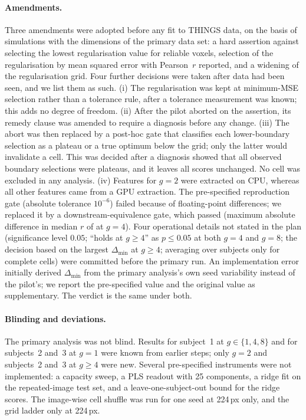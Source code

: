 \paragraph{Amendments.}
Three amendments were adopted before any fit to THINGS data, on the basis of
simulations with the dimensions of the primary data set: a hard assertion against
selecting the lowest regularisation value for reliable voxels, selection of the
regularisation by mean squared error with Pearson~$r$ reported, and a widening of the
regularisation grid. Four further decisions were taken after data had been seen, and we
list them as such. (i) The regularisation was kept at minimum-MSE selection rather than
a tolerance rule, after a tolerance measurement was known; this adds no degree of
freedom. (ii) After the pilot aborted on the assertion, its remedy clause was amended
to require a diagnosis before any change. (iii) The abort was then replaced by a post-hoc
gate that classifies each lower-boundary selection as a plateau or a true optimum below
the grid; only the latter would invalidate a cell. This was decided after a diagnosis
showed that all observed boundary selections were plateaus, and it leaves all scores
unchanged. No cell was excluded in any analysis. (iv) Features for $g = 2$ were
extracted on CPU, whereas all other features came from a GPU extraction. The
pre-specified reproduction gate (absolute tolerance $10^{-6}$) failed because of
floating-point differences; we replaced it by a downstream-equivalence gate, which
passed (maximum absolute difference in median $r$ of \GtwoGateMaxDelta{} at $g = 4$).
Four operational details not stated in the plan (significance level $0.05$; ``holds at
$g \geq 4$'' as $p \leq 0.05$ at both $g = 4$ and $g = 8$; the decision based on the
largest $\Delta_{\min}$ at $g \geq 4$; averaging over subjects only for complete cells)
were committed before the primary run. An implementation error initially derived
$\Delta_{\min}$ from the primary analysis's own seed variability instead of the pilot's;
we report the pre-specified value and the original value as supplementary. The verdict
is the same under both.

\paragraph{Blinding and deviations.}
The primary analysis was not blind. Results for subject~1 at $g \in \{1, 4, 8\}$ and for
subjects~2 and~3 at $g = 1$ were known from earlier steps; only $g = 2$ and subjects~2
and~3 at $g \geq 4$ were new. Several pre-specified instruments were not implemented:
a capacity sweep, a PLS readout with 25 components, a ridge fit on the repeated-image
test set, and a leave-one-subject-out bound for the ridge scores. The image-wise cell
shuffle was run for one seed at 224\,px only, and the grid ladder only at 224\,px.

